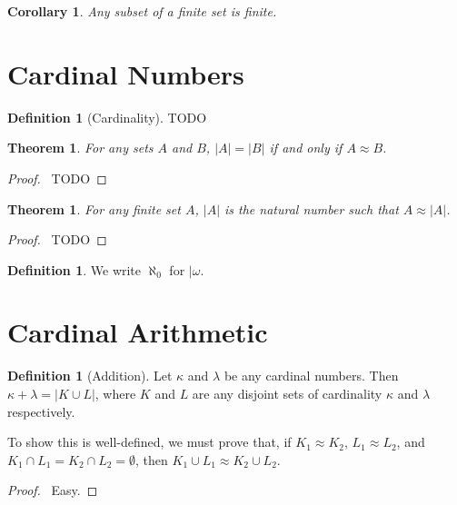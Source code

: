 \documentclass{article}
\let\qed\relax
\newtheorem{theorem}[axiom]{Theorem}
\newtheorem{corollary}{Corollary}[axiom]
\theoremstyle{definition}
\newtheorem{definition}[axiom]{Definition}
\begin{document}
    \begin{corollary}
        Any subset of a finite set is finite.
    \end{corollary}

    \section{Cardinal Numbers}

    \begin{definition}[Cardinality]
        TODO
    \end{definition}

    \begin{theorem}
        For any sets $A$ and $B$, $|A| = |B|$ if and only if $A \approx B$.
    \end{theorem}

    \begin{proof}
        \pf\ TODO \qed
    \end{proof}

    \begin{theorem}
        For any finite set $A$, $|A|$ is the natural number such that $A \approx |A|$.
    \end{theorem}

    \begin{proof}
        \pf\ TODO \qed
    \end{proof}

    \begin{definition}
        We write $\aleph_0$ for $|\omega$.
    \end{definition}

    \section{Cardinal Arithmetic}

    \begin{definition}[Addition]
        Let $\kappa$ and $\lambda$ be any cardinal numbers. Then $\kappa + \lambda = |K \cup L|$,
        where $K$ and $L$ are any disjoint sets of cardinality $\kappa$ and $\lambda$ respectively.

        To show this is well-defined, we must prove that, if $K_1 \approx K_2$, $L_1 \approx L_2$,
        and $K_1 \cap L_1 = K_2 \cap L_2 = \emptyset$, then $K_1 \cup L_1 \approx K_2 \cup L_2$.
    \end{definition}

    \begin{proof}
        \pf\ Easy.
    \end{proof}
\end{document}
